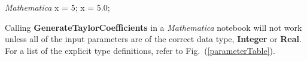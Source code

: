 \documentclass[12pt]{article}
\begin{document}
\begin{minipage}[t]{0.5\textwidth}
\centering \textit{Mathematica}
\newline
\newline
x = 5;  
\newline
x = 5.0;
\newline
\newline
\end{minipage}

Calling \mbox{\textbf{GenerateTaylorCoefficients}} in a \textit{Mathematica} notebook will not work unless all of the input parameters are of the correct data type, \textbf{Integer} or \textbf{Real}. For a list of the explicit type definitions, refer to Fig.~(\ref{parameterTable}).
\end{document}
